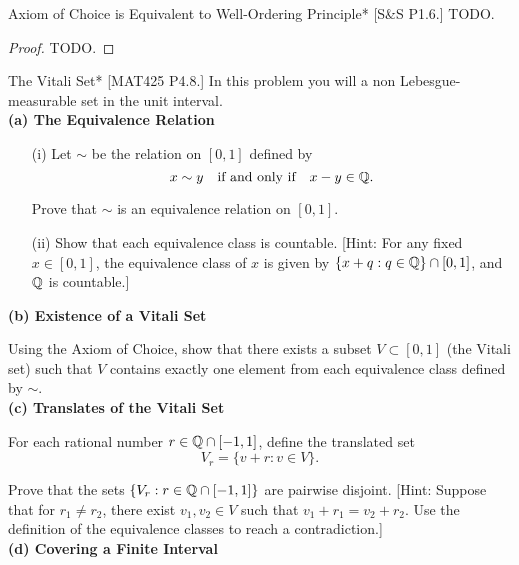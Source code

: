 \begin{problem}{Axiom of Choice is Equivalent to Well-Ordering Principle}*
    [S\&S P1.6.] TODO. 
\end{problem}

\begin{proof}
    TODO. 
\end{proof}

\begin{problem}{The Vitali Set}*
    [MAT425 P4.8.] In this problem you will a non Lebesgue-measurable set in the unit interval. \\

    \stdvspace
    \textbf{(a) The Equivalence Relation}

    \begin{itemize}
    \item[(i)] Let \(\sim\) be the relation on \([0,1]\) defined by
    \[
        x \sim y \quad \text{if and only if} \quad x - y \in \mathbb{Q}.
    \]

    Prove that \(\sim\) is an equivalence relation on \([0,1]\).

    \item[(ii)] Show that each equivalence class is countable. [Hint: For any fixed \(x \in [0,1]\), the equivalence class of \(x\) is given by \(\{x + q : q \in \mathbb{Q} \} \cap [0,1]\), and \(\mathbb{Q}\) is countable.]
    \end{itemize}

    \stdvspace
    \textbf{(b) Existence of a Vitali Set}
    \stdvspace

    Using the Axiom of Choice, show that there exists a subset \(V \subset [0,1]\) (the Vitali set) such that \(V\) contains exactly one element from each equivalence class defined by \(\sim\). \\

    \stdvspace
    \textbf{(c) Translates of the Vitali Set}
    \stdvspace

    For each rational number \(r \in \mathbb{Q} \cap [-1,1]\), define the translated set
    \[
    V_r = \{ v + r : v \in V \}.
    \]

    Prove that the sets \(\{V_r : r \in \mathbb{Q} \cap [-1,1]\}\) are pairwise disjoint. [Hint: Suppose that for \(r_1 \ne r_2\), there exist \(v_1, v_2 \in V\) such that \(v_1 + r_1 = v_2 + r_2\). Use the definition of the equivalence classes to reach a contradiction.] \\

    \stdvspace
    \textbf{(d) Covering a Finite Interval}
    \stdvspace


\end{problem}
